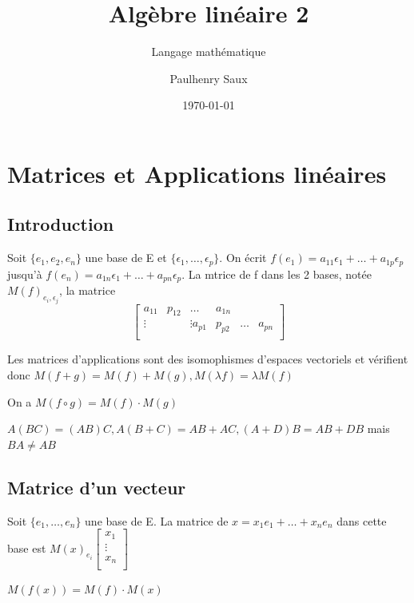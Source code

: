 \documentclass[french]{yLectureNote}
\title{Algèbre linéaire 2}
\subtitle{Langage mathématique}
\author{Paulhenry Saux}
\date{\today}
\begin{document}
\setcounter{chapter}{2}
\chapter{Matrices et Applications linéaires}
\section{Introduction}
\begin{definition}
Soit \(\{e_1,e_2,e_n\}\) une base de E et \(\{\epsilon_1,\dots,\epsilon_p\}\). On écrit \(f(e_1) = a_{11}\epsilon_1+\dots+a_{1p}\epsilon_p\) jusqu'à \(f(e_n) = a_{1n}\epsilon_1+\dots+a_{pn}\epsilon_p\). La mtrice de f dans les 2 bases, notée \(M(f)_{e_i,\epsilon_j}\), la matrice \[
\begin{bmatrix}
a_{11}&p_{12}&\dots& a_{1n}\\
\vdots & &\vdots
a_{p1}&p_{p2}&\dots& a_{pn}\\
\end{bmatrix}\]
\end{definition}
\begin{proposition}
Les matrices d'applications sont des isomophismes d'espaces vectoriels et vérifient donc \(M(f+g) = M(f)+M(g), M(\lambda f) = \lambda M(f)\)
\end{proposition}
\begin{proposition}
On a \(M(f\circ g) = M(f)\cdot M(g)\)
\end{proposition}
\begin{proposition}
\(A(BC) = (AB)C, A(B+C) = AB+AC, (A+D)B = AB+DB\) mais \(BA\neq AB\)
\end{proposition}
\section{Matrice d'un vecteur}
\begin{definition}
Soit \(\{e_1,\dots, e_n\}\) une base de E. La matrice de \(x = x_1e_1+\dots +x_ne_n\) dans cette base est \(M(x)_{e_i}\begin{bmatrix}
x_1\\
\vdots\\
x_n\\
\end{bmatrix}\)
\end{definition}
\begin{definition}
\(M(f(x)) = M(f)\cdot M(x)\)
\end{definition}
\end{document}
